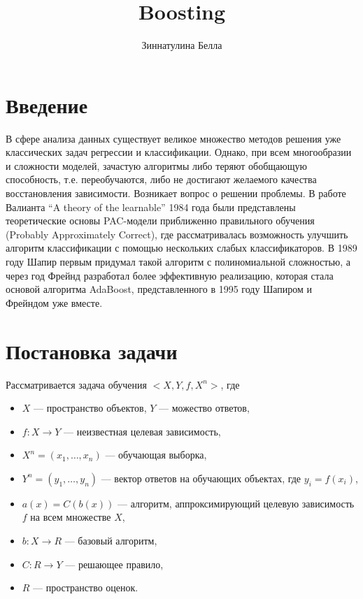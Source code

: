 \documentclass[specialist, 12pt, href]{article}
\title{Boosting}
\author{Зиннатулина Белла}
\date{}
\begin{document}
\maketitle

\section{Введение}

В сфере анализа данных существует великое множество методов решения уже классических задач регрессии и классификации. Однако, при всем многообразии и сложности моделей, зачастую алгоритмы либо теряют обобщающую способность, т.е. переобучаются, либо не достигают желаемого качества восстановления зависимости. Возникает вопрос о решении проблемы. В работе Валианта “A theory of the learnable” 1984 года были представлены теоретические основы PAC-модели приближенно правильного обучения (Probably Approximately Correct), где рассматривалась возможность улучшить алгоритм классификации с помощью нескольких слабых классификаторов. В 1989 году Шапир первым придумал такой алгоритм с полиномиальной сложностью, а через год Фрейнд разработал более эффективную реализацию, которая стала основой алгоритма AdaBoost, представленного в 1995 году Шапиром и Фрейндом уже вместе. 

\section{Постановка задачи}

Рассматривается задача обучения $<X,Y, f, X^{n}>$, где  \begin{itemize}
  \item $X$ --- пространство объектов, $Y$ --- можество ответов, 
  \item $f: X \rightarrow Y$ --- неизвестная целевая зависимость, 
  \item $X^{n} = (x_1,\dots,x_{n})$ --- обучающая выборка,
  \item $Y^{n} = (y_1,\dots, y_{n})$ --- вектор ответов на обучающих объектах, где $y_i = f(x_i)$,
  \item $a(x) = C(b(x))$ --- алгоритм, аппроксимирующий целевую зависимость $f$ на всем множестве $X$,
  \item $b:X \rightarrow R$ --- базовый алгоритм,
  \item $C:R \rightarrow Y$ --- решающее правило,
  \item $R$ --- пространство оценок.
  
\end{itemize}
\end{document}
